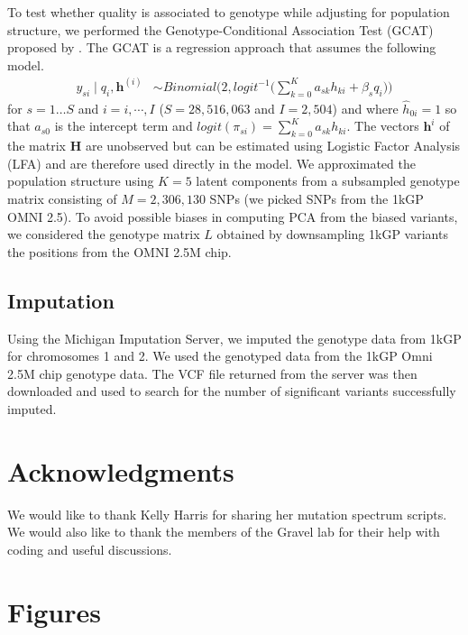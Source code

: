 \documentclass[9pt,lineno]{template}
\begin{document}
To test whether quality is associated to genotype while adjusting for population structure, we performed the Genotype-Conditional Association Test  (GCAT) proposed by \citep{song2015testing}.
The GCAT is a regression approach that assumes the following model.
\begin{align}\label{gcat}
 y_{si} \mid q_i, \boldsymbol{h}^{(i)} &\sim Binomial\bigg( 2, logit^{-1}\Big( \sum_{k=0}^{K} a_{sk} h_{ki} + \beta_s q_i\Big) \bigg)
\end{align} 
for $s=1\hdots S$ and $i=i,\cdots, I$  ($S = 28,516,063$ and $I = 2,504$) and where $\hat{h}_{0i}=1$ so that $a_{s0}$ is the intercept term and $logit(\pi_{si})=\sum_{k=0}^{K} a_{sk} h_{ki}$. 
The vectors $\boldsymbol{h}^{i}$ of the matrix $\mathbf{H}$ are unobserved but can be estimated using Logistic Factor Analysis (LFA) \citep{song2015testing} and are therefore used directly in the model. 
We approximated the population structure using $K=5$ latent components from a subsampled genotype matrix consisting of $M = 2,306,130$ SNPs (we picked SNPs from the 1kGP OMNI 2.5). 
To avoid possible biases in computing PCA from the biased variants, we considered the genotype matrix $L$ obtained by downsampling 1kGP variants the positions from the OMNI 2.5M chip.

\subsection{Imputation}
Using the Michigan Imputation Server, we imputed the genotype data from 1kGP for chromosomes 1 and 2.
We used the genotyped data from the 1kGP Omni 2.5M chip genotype data.
The VCF file returned from the server was then downloaded and used to search for the number of significant variants successfully imputed. 

\section{Acknowledgments}
We would like to thank Kelly Harris for sharing her mutation spectrum scripts.
We would also like to thank the members of the Gravel lab for their help with coding and useful discussions.



\clearpage
\section{Figures}
\renewcommand{\thefigure}{S\arabic{figure}}
\setcounter{figure}{0}   	
\end{document}
